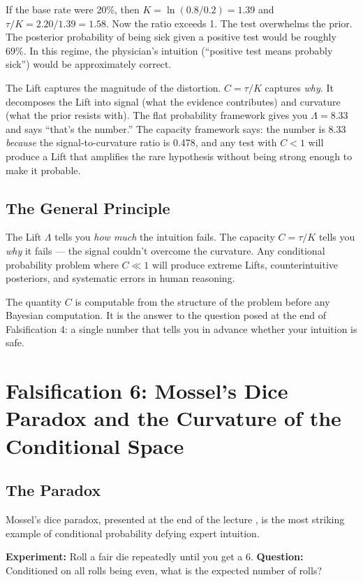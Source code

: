 \documentclass[12pt]{article}
\begin{document}
If the base rate were 20\%, then $K = \ln(0.8/0.2) = 1.39$ and $\tau/K = 2.20/1.39 = 1.58$. Now the ratio exceeds 1. The test overwhelms the prior. The posterior probability of being sick given a positive test would be roughly 69\%. In this regime, the physician's intuition (``positive test means probably sick'') would be approximately correct.

The Lift captures the magnitude of the distortion. $C = \tau/K$ captures \textit{why}. It decomposes the Lift into signal (what the evidence contributes) and curvature (what the prior resists with). The flat probability framework gives you $\Lambda = 8.33$ and says ``that's the number.'' The capacity framework says: the number is 8.33 \textit{because} the signal-to-curvature ratio is 0.478, and any test with $C < 1$ will produce a Lift that amplifies the rare hypothesis without being strong enough to make it probable.

\subsection{The General Principle}

The Lift $\Lambda$ tells you \textit{how much} the intuition fails. The capacity $C = \tau/K$ tells you \textit{why} it fails --- the signal couldn't overcome the curvature. Any conditional probability problem where $C \ll 1$ will produce extreme Lifts, counterintuitive posteriors, and systematic errors in human reasoning.

The quantity $C$ is computable from the structure of the problem before any Bayesian computation. It is the answer to the question posed at the end of Falsification 4: a single number that tells you in advance whether your intuition is safe.

\section{Falsification 6: Mossel's Dice Paradox and the Curvature of the Conditional Space}

\subsection{The Paradox}

Mossel's dice paradox, presented at the end of the lecture \cite{mossel2010}, is the most striking example of conditional probability defying expert intuition.

\textbf{Experiment:} Roll a fair die repeatedly until you get a 6. \textbf{Question:} Conditioned on all rolls being even, what is the expected number of rolls?
\end{document}
